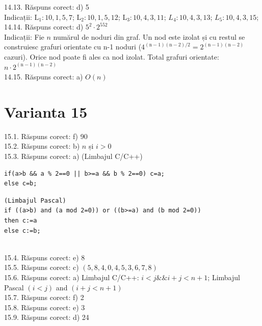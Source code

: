 14.13. Răspuns corect: d) 5\\
Indicații: $\mathrm{L}_{1}: 10,1,5,7$; $\mathrm{L}_{2}: 10,1,5,12$; $\mathrm{L}_{3}: 10,4,3,11$; $L_{4}: 10,4,3,13$; $L_{5}: 10,4,3,15$;\\

14.14. Răspuns corect: d) $5^{2} \cdot 2^{552}$\\
Indicații: Fie $n$ numărul de noduri din graf. Un nod este izolat și cu restul se construiesc grafuri orientate cu n-1 noduri ($4^{(\mathrm{n}-1)(\mathrm{n}-2) / 2}=2^{(\mathrm{n}-1)(\mathrm{n}-2)}$ cazuri). Orice nod poate fi ales ca nod izolat. Total grafuri orientate: $n \cdot 2^{(\mathrm{n}-1)(\mathrm{n}-2)}$\\

14.15. Răspuns corect: a) $O(n)$\\

\section*{Varianta 15}

15.1. Răspuns corect: f) 90\\

15.2. Răspuns corect: b) $n$ și $i>0$\\

15.3. Răspuns corect: a)
(Limbajul C/C++)
\begin{verbatim}
if(a>b && a % 2==0 || b>=a && b % 2==0) c=a;
else c=b;
\end{verbatim}
\begin{verbatim}
(Limbajul Pascal)
if ((a>b) and (a mod 2=0)) or ((b>=a) and (b mod 2=0))
then c:=a
else c:=b;
\end{verbatim}\\

15.4. Răspuns corect: e) 8\\

15.5. Răspuns corect: c) $(5,8,4,0,4,5,3,6,7,8)$\\

15.6. Răspuns corect: a) Limbajul C/C++: $i<j \&\& i+j<n+1$; Limbajul Pascal $(i<j)$ and $(i+j<n+1)$\\

15.7. Răspuns corect: f) 2\\

15.8. Răspuns corect: e) 3\\

15.9. Răspuns corect: d) 24\\

